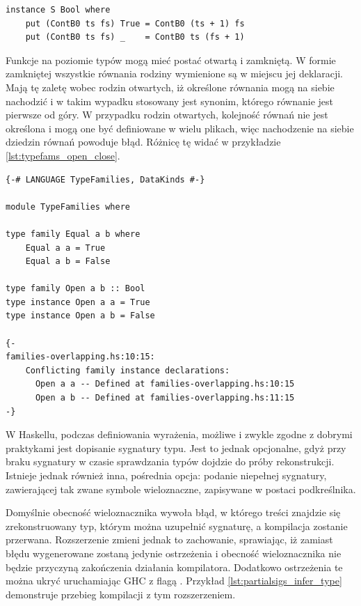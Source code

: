 {\begin{lstlisting}[float,label={lst:typefams_assoc_standalone},
                   caption={Przykład pozwiązanej z klasą i niezależnej rodziny typów.}]
instance S Bool where
    put (ContB0 ts fs) True = ContB0 (ts + 1) fs
    put (ContB0 ts fs) _    = ContB0 ts (fs + 1)
\end{lstlisting}

Funkcje na poziomie typów mogą mieć postać otwartą i zamkniętą. W formie zamkniętej wszystkie równania rodziny wymienione są w miejscu jej deklaracji. Mają tę zaletę wobec rodzin otwartych, iż określone równania mogą na siebie nachodzić i w takim wypadku stosowany jest synonim, którego równanie jest pierwsze od góry. W przypadku rodzin otwartych, kolejność równań nie jest określona i mogą one być definiowane w wielu plikach, więc nachodzenie na siebie dziedzin równań powoduje błąd. Różnicę tę widać w przykładzie \ref{lst:typefams_open_close}\cite{GuideTypeFamilies}.

\begin{lstlisting}[float,label={lst:typefams_open_close},
                   caption={Przykład otwartej i zamkniętej funkcji na typach z nachodzącymi na siebie dziedzinami.}]
{-# LANGUAGE TypeFamilies, DataKinds #-}

module TypeFamilies where

type family Equal a b where
    Equal a a = True
    Equal a b = False

type family Open a b :: Bool
type instance Open a a = True
type instance Open a b = False

{-
families-overlapping.hs:10:15:
    Conflicting family instance declarations:
      Open a a -- Defined at families-overlapping.hs:10:15
      Open a b -- Defined at families-overlapping.hs:11:15
-}
\end{lstlisting}

\label{sec:partial_sigs}

W Haskellu, podczas definiowania wyrażenia, możliwe i zwykle zgodne z dobrymi praktykami jest dopisanie sygnatury typu. Jest to jednak opcjonalne, gdyż przy braku sygnatury w czasie sprawdzania typów dojdzie do próby rekonstrukcji. Istnieje jednak również inna, pośrednia opcja: podanie niepełnej sygnatury, zawierającej tak zwane symbole wieloznaczne, zapisywane w postaci podkreślnika.

Domyślnie obecność wieloznacznika wywoła błąd, w którego treści znajdzie się zrekonstruowany typ, którym można uzupełnić sygnaturę, a kompilacja zostanie przerwana. Rozszerzenie  zmieni jednak to zachowanie, sprawiając, iż zamiast błędu wygenerowane zostaną jedynie ostrzeżenia i obecność wieloznacznika nie będzie przyczyną zakończenia działania kompilatora. Dodatkowo ostrzeżenia te można ukryć uruchamiając GHC z flagą . Przykład \ref{lst:partialsigs_infer_type} demonstruje przebieg kompilacji z tym rozszerzeniem.

}
